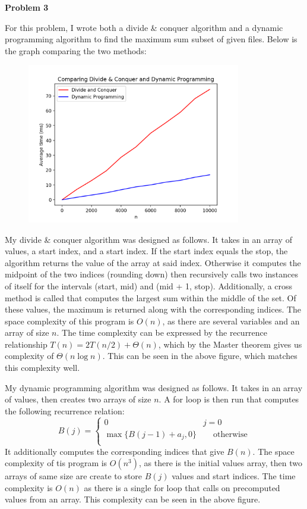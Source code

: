 \documentclass{article}
\newcommand{\Problem}[1]{\textbf{\large Problem #1}}
\begin{document}
\Problem{3}

For this problem, I wrote both a divide \& conquer algorithm and a dynamic programming algorithm to find the maximum sum subset of given files. 
Below is the graph comparing the two methods:
\begin{figure}[H]
\centering
\includegraphics[height=7cm]{comparison}
\end{figure}


My divide \& conquer algorithm was designed as follows.
It takes in an array of values, a start index, and a start index.
If the start index equals the stop, the algorithm returns the value of the array at said index.
Otherwise it computes the midpoint of the two indices (rounding down) then recursively calls two instances of itself for the intervals (start, mid) and (mid + 1, stop).
Additionally, a cross method is called that computes the largest sum within the middle of the set. 
Of these values, the maximum is returned along with the corresponding indices. 
The space complexity of this program is $O(n)$, as there are several variables and an array of size $n$. 
The time complexity can be expressed by the recurrence relationship $T(n) = 2T(n/2) + \Theta(n)$, which by the Master theorem gives us complexity of $\Theta(n\log{n})$. 
This can be seen in the above figure, which matches this complexity well. 

My dynamic programming algorithm was designed as follows.
It takes in an array of values, then creates two arrays of size $n$. 
A for loop is then run that computes the following recurrence relation:
\begin{equation*}
B(j) = 
\begin{cases}
	0 \qquad\qquad\qquad\qquad\qquad\quad\ \, j = 0\\
	\max{\{B(j-1) + a_j, 0\}}\qquad \text{otherwise}\\
\end{cases}	
\end{equation*}
It additionally computes the corresponding indices that give $B(n)$. 
The space complexity of tis program is $O(n^3)$, as there is the initial values array, then two arrays of same size are create to store $B(j)$ values and start indices. 
The time complexity is $O(n)$ as there is a single for loop that calls on precomputed values from an array. 
This complexity can be seen in the above figure. 
\end{document}
